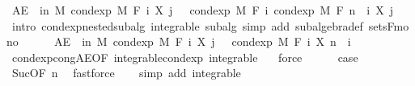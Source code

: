\begin{isabellebody}
\ {\isachardoublequoteopen}AE\ {\isasymxi}\ in\ M{\isachardot}{\kern0pt}\ cond{\isacharunderscore}{\kern0pt}exp\ M\ {\isacharparenleft}{\kern0pt}F\ i{\isacharparenright}{\kern0pt}\ {\isacharparenleft}{\kern0pt}X\ j{\isacharparenright}{\kern0pt}\ {\isasymxi}\ {\isacharequal}{\kern0pt}\ cond{\isacharunderscore}{\kern0pt}exp\ M\ {\isacharparenleft}{\kern0pt}F\ i{\isacharparenright}{\kern0pt}\ {\isacharparenleft}{\kern0pt}cond{\isacharunderscore}{\kern0pt}exp\ M\ {\isacharparenleft}{\kern0pt}F\ {\isacharparenleft}{\kern0pt}n\ {\isacharplus}{\kern0pt}\ i{\isacharparenright}{\kern0pt}{\isacharparenright}{\kern0pt}\ {\isacharparenleft}{\kern0pt}X\ j{\isacharparenright}{\kern0pt}{\isacharparenright}{\kern0pt}\ {\isasymxi}{\isachardoublequoteclose}\ \isamarkupfalse%
\ {\isacharparenleft}{\kern0pt}intro\ cond{\isacharunderscore}{\kern0pt}exp{\isacharunderscore}{\kern0pt}nested{\isacharunderscore}{\kern0pt}subalg\ integrable\ subalg{\isacharcomma}{\kern0pt}\ simp\ add{\isacharcolon}{\kern0pt}\ subalgebra{\isacharunderscore}{\kern0pt}def\ sets{\isacharunderscore}{\kern0pt}F{\isacharunderscore}{\kern0pt}mono{\isacharparenright}{\kern0pt}\isanewline
\ \ \ \ \isamarkupfalse%
\ {\isachardoublequoteopen}AE\ {\isasymxi}\ in\ M{\isachardot}{\kern0pt}\ cond{\isacharunderscore}{\kern0pt}exp\ M\ {\isacharparenleft}{\kern0pt}F\ i{\isacharparenright}{\kern0pt}\ {\isacharparenleft}{\kern0pt}X\ j{\isacharparenright}{\kern0pt}\ {\isasymxi}\ {\isacharequal}{\kern0pt}\ cond{\isacharunderscore}{\kern0pt}exp\ M\ {\isacharparenleft}{\kern0pt}F\ i{\isacharparenright}{\kern0pt}\ {\isacharparenleft}{\kern0pt}X\ {\isacharparenleft}{\kern0pt}n\ {\isacharplus}{\kern0pt}\ i{\isacharparenright}{\kern0pt}{\isacharparenright}{\kern0pt}\ {\isasymxi}{\isachardoublequoteclose}\ \isamarkupfalse%
\ cond{\isacharunderscore}{\kern0pt}exp{\isacharunderscore}{\kern0pt}cong{\isacharunderscore}{\kern0pt}AE{\isacharbrackleft}{\kern0pt}OF\ integrable{\isacharunderscore}{\kern0pt}cond{\isacharunderscore}{\kern0pt}exp\ integrable\ {\isacharasterisk}{\kern0pt}{\isacharbrackright}{\kern0pt}\ \isamarkupfalse%
\ force\isanewline
\ \ \ \ \isamarkupfalse%
\ {\isacharquery}{\kern0pt}case\ \isamarkupfalse%
\ Suc{\isacharparenleft}{\kern0pt}{}{\isacharparenright}{\kern0pt}{\isacharbrackleft}{\kern0pt}OF\ n{\isacharbrackright}{\kern0pt}\ \isamarkupfalse%
\ fastforce\isanewline
\ \ \isamarkupfalse%
\isanewline
{}\isamarkupfalse%
\ {\isacharparenleft}{\kern0pt}simp\ add{\isacharcolon}{\kern0pt}\ integrable{\isacharparenright}{\kern0pt}%

\end{isabellebody}
